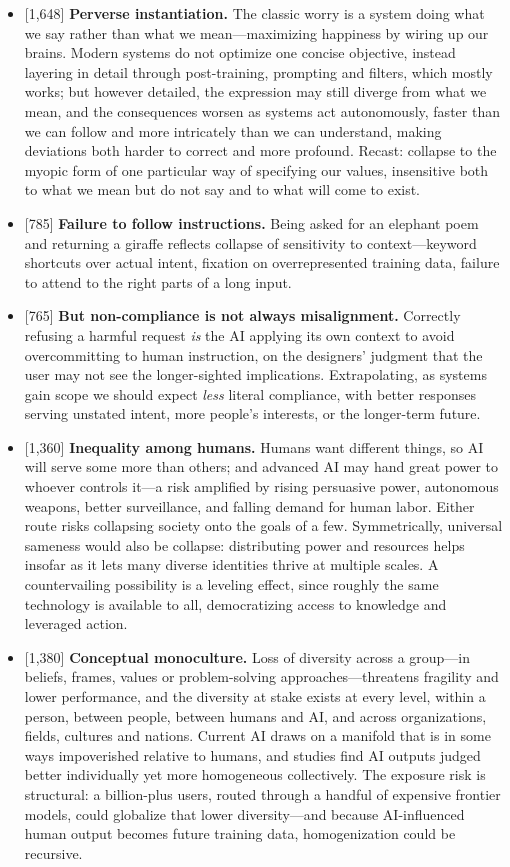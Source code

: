 \documentclass[11pt]{article}
\newcommand{\ct}[1]{{\footnotesize\color{black!55}[#1]}\hspace{1pt}}
\begin{document}
\begin{itemize}
  \item \ct{1,648} \textbf{Perverse instantiation.} The classic worry is a system doing what we say rather than what we mean---maximizing happiness by wiring up our brains. Modern systems do not optimize one concise objective, instead layering in detail through post-training, prompting and filters, which mostly works; but however detailed, the expression may still diverge from what we mean, and the consequences worsen as systems act autonomously, faster than we can follow and more intricately than we can understand, making deviations both harder to correct and more profound. Recast: collapse to the myopic form of one particular way of specifying our values, insensitive both to what we mean but do not say and to what will come to exist.
  \item \ct{785} \textbf{Failure to follow instructions.} Being asked for an elephant poem and returning a giraffe reflects collapse of sensitivity to context---keyword shortcuts over actual intent, fixation on overrepresented training data, failure to attend to the right parts of a long input.
  \item \ct{765} \textbf{But non-compliance is not always misalignment.} Correctly refusing a harmful request \emph{is} the AI applying its own context to avoid overcommitting to human instruction, on the designers' judgment that the user may not see the longer-sighted implications. Extrapolating, as systems gain scope we should expect \emph{less} literal compliance, with better responses serving unstated intent, more people's interests, or the longer-term future.
  \item \ct{1,360} \textbf{Inequality among humans.} Humans want different things, so AI will serve some more than others; and advanced AI may hand great power to whoever controls it---a risk amplified by rising persuasive power, autonomous weapons, better surveillance, and falling demand for human labor. Either route risks collapsing society onto the goals of a few. Symmetrically, universal sameness would also be collapse: distributing power and resources helps insofar as it lets many diverse identities thrive at multiple scales. A countervailing possibility is a leveling effect, since roughly the same technology is available to all, democratizing access to knowledge and leveraged action.
  \item \ct{1,380} \textbf{Conceptual monoculture.} Loss of diversity across a group---in beliefs, frames, values or problem-solving approaches---threatens fragility and lower performance, and the diversity at stake exists at every level, within a person, between people, between humans and AI, and across organizations, fields, cultures and nations. Current AI draws on a manifold that is in some ways impoverished relative to humans, and studies find AI outputs judged better individually yet more homogeneous collectively. The exposure risk is structural: a billion-plus users, routed through a handful of expensive frontier models, could globalize that lower diversity---and because AI-influenced human output becomes future training data, homogenization could be recursive.

\end{itemize}
\end{document}
